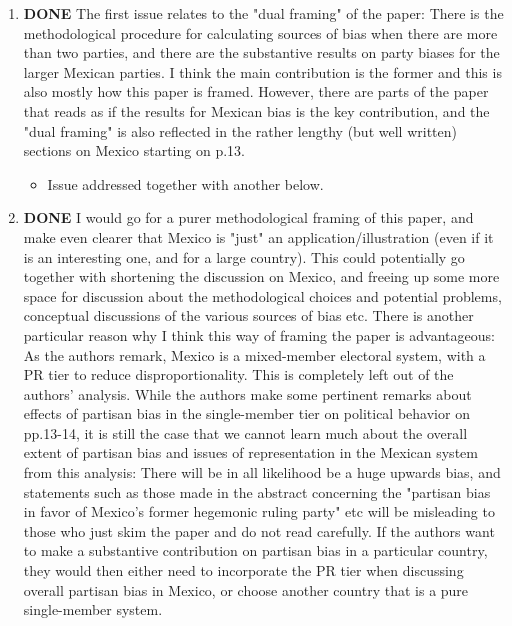 \documentclass{article}
\begin{document}
\begin{enumerate}
\begin{itemize}
\end{itemize}
\item {\bfseries\sffamily DONE} The first issue relates to the "dual framing" of the paper: There is the methodological procedure for calculating sources of bias when there are more than two parties, and there are the substantive results on party biases for the larger Mexican parties. I think the main contribution is the former and this is also mostly how this paper is framed. However, there are parts of the paper that reads as if the results for Mexican bias is the key contribution, and the "dual framing" is also reflected in the rather lengthy (but well written) sections on Mexico starting on p.13.
\label{sec:orgheadline6}
\begin{itemize}
\item Issue addressed together with another below.
\end{itemize}
\item {\bfseries\sffamily DONE} I would go for a purer methodological framing of this paper, and make even clearer that Mexico is "just" an application/illustration (even if it is an interesting one, and for a large country). This could potentially go together with shortening the discussion on Mexico, and  freeing up some more space for discussion about the methodological choices and potential problems, conceptual discussions of the various sources of bias etc. There is another particular reason why I think this way of framing the paper is advantageous: As the authors remark, Mexico is a mixed-member electoral system, with a PR tier to reduce disproportionality. This is completely left out of the authors' analysis. While the authors make some pertinent remarks about effects of partisan bias in the single-member tier on political behavior on pp.13-14, it is still the case that we cannot learn much about the overall extent of partisan bias and issues of representation in the Mexican system from this analysis: There will be in all likelihood be a huge upwards bias, and statements such as those made in the abstract concerning the "partisan bias in favor of Mexico's former hegemonic ruling party" etc will be misleading to those who just skim the paper and do not read carefully. If the authors want to make a substantive contribution on partisan bias in a particular country, they would then either need to incorporate the PR tier when discussing overall partisan bias in Mexico, or choose another country  that is a pure single-member system.
\label{sec:orgheadline7}
\begin{itemize}

\end{itemize}
\end{enumerate}
\end{document}
